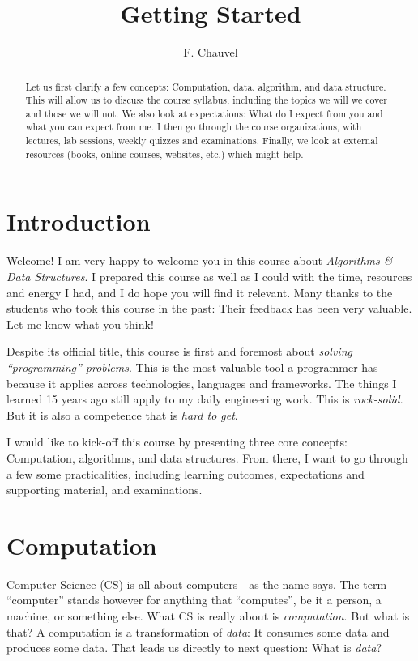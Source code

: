 \documentclass{aldast}
\title{Getting Started}
\author{F. Chauvel}
\begin{document}
\maketitle

\begin{abstract}
  Let us first clarify a few concepts: Computation, data, algorithm,
  and data structure. This will allow us to discuss the course
  syllabus, including the topics we will we cover and those we will
  not. We also look at expectations: What do I expect from you and
  what you can expect from me. I then go through the course
  organizations, with lectures, lab sessions, weekly quizzes and
  examinations. Finally, we look at external resources (books, online
  courses, websites, etc.) which might help.
\end{abstract}


\section*{Introduction}
Welcome! I am very happy to
welcome you in this course about \emph{Algorithms \& Data
  Structures}. I prepared this course as well as I could with the
time, resources and energy I had, and I do hope you will find it
relevant. Many thanks to the students who took this course in the
past: Their feedback has been very valuable. Let me know what you
think!

Despite its official title, this course is first and foremost about
\emph{solving ``programming'' problems}. This is the most valuable
tool a programmer has because it applies across technologies,
languages and frameworks. The things I learned 15 years ago still apply
to my daily engineering work. This is \emph{rock-solid}. But it is
also a competence that is \emph{hard to get}.

I would like to kick-off this course by presenting three core
concepts: Computation, algorithms, and data structures. From there, I
want to go through a few some practicalities, including learning
outcomes, expectations and supporting material, and examinations.


\section{Computation}
Computer Science (CS) is all about computers---as the name says. The
term ``computer'' stands however for anything that ``computes'', be it
a person, a machine, or something else. What CS is really about is
\emph{computation}. But what is that? A computation is a
transformation of \emph{data}: It consumes some data and produces some
data. That leads us directly to next question: What is \emph{data}?
\end{document}
